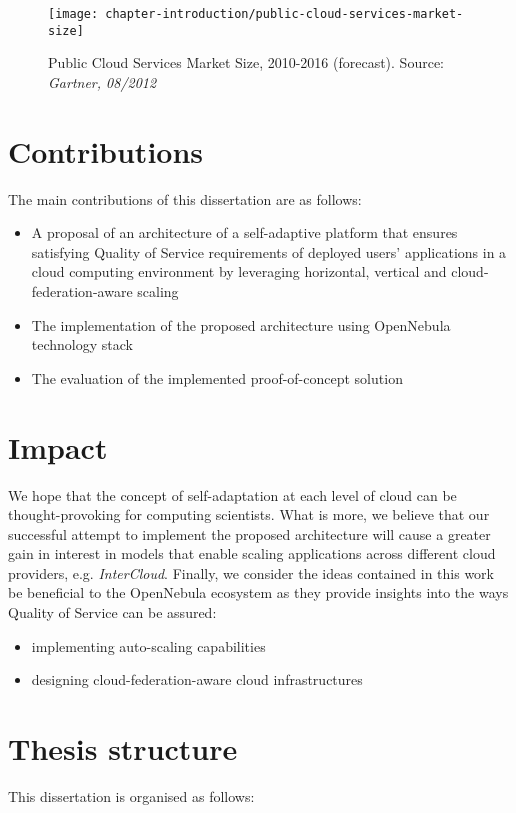\begin{figure}[!ht]
  \begin{center}
    \texttt{[image: chapter-introduction/public-cloud-services-market-size]}
  \end{center}
  \caption{Public Cloud Services Market Size, 2010-2016 (forecast). Source: \textit{Gartner, 08/2012}}
  \label{chapter-fig:public-cloud-services-market-size}
\end{figure}

\section{Contributions}
The main contributions of this dissertation are as follows:
\begin{itemize}
  \item A proposal of an architecture of a self-adaptive platform that ensures satisfying Quality of Service requirements of deployed users' applications in a cloud computing environment by leveraging horizontal, vertical and cloud-federation-aware scaling
  \item The implementation of the proposed architecture using OpenNebula technology stack
  \item The evaluation of the implemented proof-of-concept solution
\end{itemize}

\section{Impact}
We hope that the concept of self-adaptation at each level of cloud can be thought-provoking for computing scientists.  What is more, we believe that our successful attempt to implement the proposed architecture will cause a greater gain in interest in models that enable scaling applications across different cloud providers, e.g. \emph{InterCloud}.
Finally, we consider the ideas contained in this work be beneficial to the OpenNebula ecosystem as they provide insights into the ways Quality of Service can be assured:
\begin{itemize}
  \item implementing auto-scaling capabilities
  \item designing cloud-federation-aware cloud infrastructures
\end{itemize}

\section{Thesis structure}
This dissertation is organised as follows:

